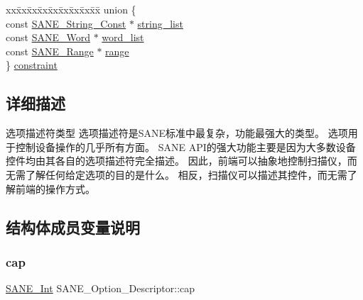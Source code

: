 \begin{DoxyCompactItemize}
\item 
\begin{tabbing}
xx\=xx\=xx\=xx\=xx\=xx\=xx\=xx\=xx\=\kill
union \{\\
\>const \hyperlink{sane_8h_a9a47323dab2a36db080f1bcc11585af4}{SANE\_String\_Const} $\ast$ \hyperlink{structSANE__Option__Descriptor_a9526628ce75d40ebb74cc917dc919fde}{string\_list}\\
\>const \hyperlink{sane_8h_aa65d63e57d37984b9d873811a7544b4a}{SANE\_Word} $\ast$ \hyperlink{structSANE__Option__Descriptor_af23d6a521f5ae9e57bdbda3e3bfb7526}{word\_list}\\
\>const \hyperlink{structSANE__Range}{SANE\_Range} $\ast$ \hyperlink{structSANE__Option__Descriptor_a0f1bd3fe216630e36c84896ac384a233}{range}\\
\} \hyperlink{structSANE__Option__Descriptor_a80649aa043f3209173efcb22a6bcd5e5}{constraint}\\

\end{tabbing}\end{DoxyCompactItemize}


\subsection{详细描述}
选项描述符类型 选项描述符是\+S\+A\+N\+E标准中最复杂，功能最强大的类型。 选项用于控制设备操作的几乎所有方面。 S\+A\+NE A\+P\+I的强大功能主要是因为大多数设备控件均由其各自的选项描述符完全描述。 因此，前端可以抽象地控制扫描仪，而无需了解任何给定选项的目的是什么。 相反，扫描仪可以描述其控件，而无需了解前端的操作方式。 

\subsection{结构体成员变量说明}
\mbox{\label{structSANE__Option__Descriptor_a884b023bc72593766267a98ee0333607}} 
\subsubsection{\texorpdfstring{cap}{cap}}
{\footnotesize\ttfamily \hyperlink{sane_8h_a18b0de32eae6997909ae9ab0117af3d5}{S\+A\+N\+E\+\_\+\+Int} S\+A\+N\+E\+\_\+\+Option\+\_\+\+Descriptor\+::cap}

